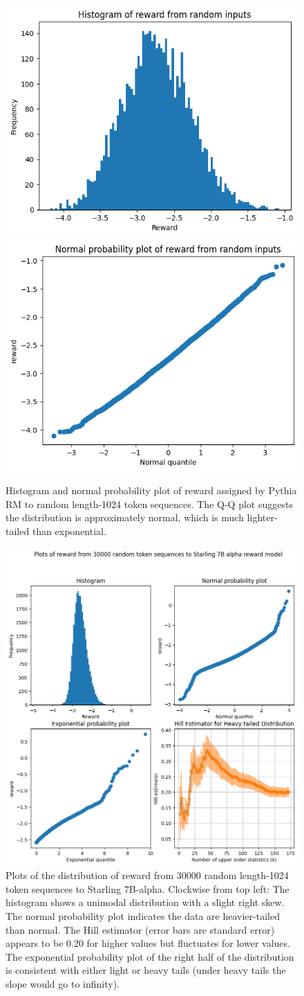 \documentclass{article}
\begin{document}
\begin{figure}
    \centering
    \includegraphics[width=0.4\linewidth]{reward_hist_random_pythia.png}
    \includegraphics[width=0.4\linewidth]{reward_qq_random_pythia.png}
    \caption{Histogram and normal probability plot of reward assigned by Pythia RM to random length-1024 token sequences. The Q-Q plot suggests the distribution is approximately normal, which is much lighter-tailed than exponential.}
    \label{fig:pythia-random}
\end{figure}

\begin{figure}
    \centering
    \includegraphics[width=0.7\linewidth]{images/reward_plots_random_starling_30k_se.png}
    \caption{Plots of the distribution of reward from 30000 random length-1024 token sequences to Starling 7B-alpha. Clockwise from top left: The histogram shows a unimodal distribution with a slight right skew. The normal probability plot indicates the data are heavier-tailed than normal. The Hill estimator (error bars are standard error) appears to be 0.20 for higher values but fluctuates for lower values. The exponential probability plot of the right half of the distribution is consistent with either light or heavy tails (under heavy tails the slope would go to infinity).}
    \label{fig:starling-random}
\end{figure}
\end{document}
